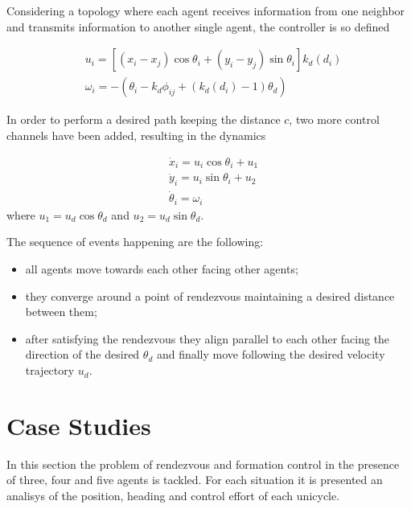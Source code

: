 \documentclass[11pt]{article}
\begin{document}
Considering a topology where each agent receives information from one neighbor and transmits information to another single agent, the controller is so defined

\begin{align}
& u_i = [(x_i - x_j)\cos\theta_i + (y_i - y_j)\sin\theta_i]k_d(d_i)\\
& \omega_i = -(\theta_i - k_d\phi_{ij} + (k_d(d_i)-1)\theta_d)
\end{align}

In order to perform a desired path keeping the distance $c$, two more control channels have been added, resulting in the dynamics

\begin{align}
&\dot{x}_i = u_i\cos\theta_i + u_1\\
&\dot{y}_i = u_i\sin\theta_i + u_2\\
&\dot{\theta}_i = \omega_i
\end{align}
where $u_1 = u_d \cos \theta_d$ and $u_2 = u_d \sin \theta_d$.

The sequence of events happening are the following: 
\begin{itemize}
\item all agents move towards each other facing other agents; 
\item they converge around a point of rendezvous maintaining a desired distance between them;
\item after satisfying the rendezvous they align parallel to each other facing the direction of the desired $\theta_d$ and finally move following the desired velocity trajectory $u_d$.
\end{itemize}

\section*{Case Studies}
In this section the problem of rendezvous and formation control in the presence of three, four and five agents is tackled. For each situation it is presented an analisys of the position, heading and control effort of each unicycle.
\end{document}
